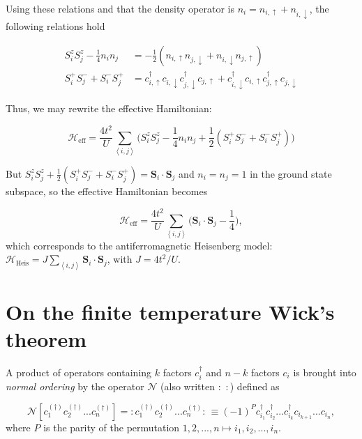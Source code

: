 Using these relations and that the density operator is $n_i = n_{i,\uparrow} + n_{i,\downarrow}$, the following relations hold

\begin{equation}
\begin{split}
S_i^z S_j^z - \frac{1}{4} n_i n_j &= -\frac{1}{2} ( n_{i,\uparrow} n_{j,\downarrow} + n_{i,\downarrow} n_{j,\uparrow} ) \\
S_i^+ S_j^- + S_i^- S_j^+ &= c_{i,\uparrow}^\dagger c_{i,\downarrow} c_{j,\downarrow}^\dagger  c_{j,\uparrow} +  c_{i,\downarrow}^\dagger c_{i,\uparrow} c_{j,\uparrow}^\dagger  c_{j,\downarrow}
\end{split}
\end{equation}

Thus, we may rewrite the effective Hamiltonian:

\begin{equation}
\mathcal{H}_{\text{eff}} = \frac{4t^2}{U} \sum_{\left\langle i, j \right\rangle} \bigg( S_i^z S_j^z - \frac{1}{4} n_i n_j + \frac{1}{2} ( S_i^+ S_j^- + S_i^- S_j^+ ) \bigg)
\end{equation}

But $S_i^z S_j^z + \frac{1}{2} ( S_i^+ S_j^- + S_i^- S_j^+) = \bm S_i \cdot \bm S_j$ and $n_i = n_j = 1$ in the ground state subspace, so the effective Hamiltonian becomes

\begin{equation}
\mathcal{H}_{\text{eff}} = \frac{4t^2}{U} \sum_{\left\langle i, j \right\rangle} \bigg( \bm S_i \cdot \bm S_j  - \frac{1}{4}  \bigg),
\end{equation}
which corresponds to the antiferromagnetic Heisenberg model: $\mathcal{H}_{\text{Heis}} = J \sum_{\left\langle i, j \right\rangle} \bm S_i \cdot \bm S_j $, with $J = 4 t^2 / U$.

\section{On the finite temperature Wick's theorem}
\label{sec:wick}

A product of operators containing $k$ factors $c_i^\dagger$ and $n - k$ factors $c_i$ is brought into \emph{normal ordering} by the operator $\mathcal{N}$ (also written $: \,\,:$) defined as

\begin{equation}
\mathcal{N} [ c_1^{(\dagger)} c_2^{(\dagger)} ... c_n^{(\dagger)} ] = :  c_1^{(\dagger)} c_2^{(\dagger)} ... c_n^{(\dagger)}  : \, \equiv ( - 1 )^P c_{i_1}^{\dagger} c_{i_2}^{\dagger} ... c_{i_k}^{\dagger} c_{i_{k+1}} ... c_{i_n} ,
\end{equation}
where $P$ is the parity of the permutation $1, 2, ..., n \mapsto i_1, i_2, ..., i_n$.


